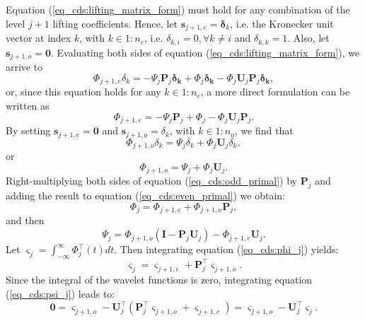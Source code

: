 \documentclass[graybox]{svmult}
\begin{document}
	Equation (\ref{eq_cds:lifting_matrix_form}) must hold for any combination of the level $j+1$ lifting coefficients. Hence, let $\mathbf{s}_{j+1,e} = \boldsymbol{\delta}_k$, i.e. the Kronecker unit vector at index $k$, with $k \in {1:n_e}$, i.e. $\delta_{k,i} = 0, \forall k \neq i$ and $\delta_{k,k} = 1$. Also, let $\mathbf{s}_{j+1,o} = \mathbf{0}$. Evaluating both sides of equation (\ref{eq_cds:lifting_matrix_form}), we arrive to
	\begin{equation}
	\Phi_{j+1,e}\delta_k = -\Psi_j\mathbf{P}_j\boldsymbol{\delta_k} + \Phi_j \boldsymbol{\delta_k} - \Phi_j \mathbf{U}_j\mathbf{P}_j \boldsymbol{\delta_k},
	\end{equation}
	or, since this equation holds for any $k \in {1: n_e}$, a more direct formulation can be written as
	\begin{equation}
	\Phi_{j+1,e}= -\Psi_j\mathbf{P}_j + \Phi_j  - \Phi_j \mathbf{U}_j\mathbf{P}_j.
	\label{eq_cds:even_primal}
	\end{equation}
	By setting $\mathbf{s}_{j+1,e} = \mathbf{0}$ and $\mathbf{s}_{j+1,o} = \delta_k$, with $k \in {1: n_o}$, we find that
	\begin{equation}
	\Phi_{j+1,o}\delta_k  = \Psi_j \delta_k + \Phi_j \mathbf{U}_j \delta_k,
	\end{equation}
	or
	\begin{equation}
	\Phi_{j+1,o} = \Psi_j + \Phi_j \mathbf{U}_j.
	\label{eq_cds:odd_primal}
	\end{equation}
	Right-multiplying both sides of equation (\ref{eq_cds:odd_primal}) by $\mathbf{P}_j$ and adding the result to equation (\ref{eq_cds:even_primal}) we obtain:
	\begin{equation}
	\Phi_j = \Phi_{j+1,e} + \Phi_{j+1,o} \mathbf{P}_j,
	\label{eq_cds:phi_j}
	\end{equation}
	and then
	\begin{equation}
	\Psi_j = \Phi_{j+1,o}(\mathbf{I} - \mathbf{P}_j\mathbf{U}_j) - \Phi_{j+1,e}\mathbf{U}_j.
	\label{eq_cds:psi_j}
	\end{equation}
	Let $\varsigma_j = \int_{-\infty}^{\infty}{\Phi_j^\intercal(t) dt}$. Then integrating equation (\ref{eq_cds:phi_j}) yields:
	\begin{equation}
	\varsigma_j = \varsigma_{j+1,e} + \mathbf{P}_j^\intercal \varsigma_{j+1,o}.
	\label{eq_cds:int_scaling}
	\end{equation}
	Since the integral of the wavelet functions is zero, integrating equation (\ref{eq_cds:psi_j})  leads to:
	\begin{equation}
	\mathbf{0} = \varsigma_{j+1,o} - \mathbf{U}_j^\intercal \left(\mathbf{P}_j^\intercal \varsigma_{j+1,o} + \varsigma_{j+1,e} \right) = \varsigma_{j+1,o} - \mathbf{U}_j^\intercal \varsigma_j.
	\label{eq_cds:int_wavelet}
	\end{equation}
\end{document}
